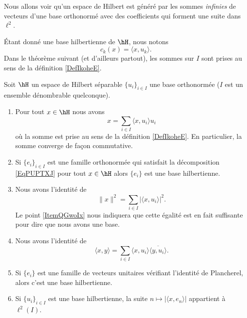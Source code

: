 Nous allons voir qu'un espace de Hilbert est généré par les sommes \emph{infinies} de vecteurs d'une base orthonormé avec des coefficients qui forment une suite dans \( \ell^2\).

Étant donné une base hilbertienne de \( \hH\), nous notons
\begin{equation}
    c_k(x)=\langle x, u_k\rangle .
\end{equation}
Dans le théorème suivant (et d'ailleurs partout), les sommes sur \( I\) sont prises au sens de la définition \ref{DefIkoheE}.


\begin{theorem}     \label{ThoyAjoqP}
    Soit \( \hH\) un espace de Hilbert séparable \( \{ u_i \}_{i\in I}\) une base orthonormée (\( I\) est un ensemble dénombrable quelconque). 

    \begin{enumerate}
        \item \label{ItemQGwoIxi}
            Pour tout \( x\in \hH\) nous avons
            \begin{equation}        \label{EqPUPTXJ}
                x=\sum_{i\in I}\langle x, u_i\rangle u_i
            \end{equation}
            où la somme est prise au sens de la définition \ref{DefIkoheE}. En particulier, la somme converge de façon commutative.

        \item

            Si \( \{ e_i \}_{i\in I}\) est une famille orthonormée qui satisfait la décomposition \eqref{EqPUPTXJ} pour tout \( x\in \hH\) alors \( \{ e_i \}\) est une base hilbertienne.
        \item
            Nous avons l'identité de 
            \begin{equation}
                \| x \|^2=\sum_{i\in I}| \langle x, u_i\rangle  |^2.
            \end{equation}
            Le point \ref{ItemQGwoIx} nous indiquera que cette égalité est en fait suffisante pour dire que nous avons une base.
        \item
            Nous avons l'identité de 
            \begin{equation}    \label{EqHZxjtKt}
                \langle x, y\rangle =\sum_{i\in I}\langle x, u_i\rangle \overline{ \langle y, u_i\rangle  }.
            \end{equation}
        \item   \label{ItemQGwoIx}
            Si \( \{ e_i \}\) est une famille de vecteurs unitaires vérifiant l'identité de Plancherel, alors c'est une base hilbertienne.
        \item
            Si \( \{ u_i \}_{i\in I}\) est une base hilbertienne, la suite \( n\mapsto| \langle x, e_n\rangle  |\) appartient à \( \ell^2(I)\).
    \end{enumerate}
\end{theorem}

